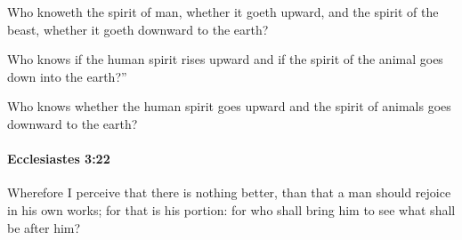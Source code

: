 			\begin{versebox}
					\item[BHS] 
					\item[LXX] 
					\item[ASV] Who knoweth the spirit of man, whether it goeth upward, and the spirit of the beast, whether it goeth downward to the earth?
					\item[NIV] Who knows if the human spirit rises upward and if the spirit of the animal goes down into the earth?”
					\item[NRSV] Who knows whether the human spirit goes upward and the spirit of animals goes downward to the earth?
			\end{versebox}

		\paragraph{Ecclesiastes 3:22} %
			\label{ECCLESIASTES-3-22}

			Wherefore I perceive that there is nothing better, than that a man should rejoice in his own works; for that is his portion: for who shall bring him to see what shall be after him?

